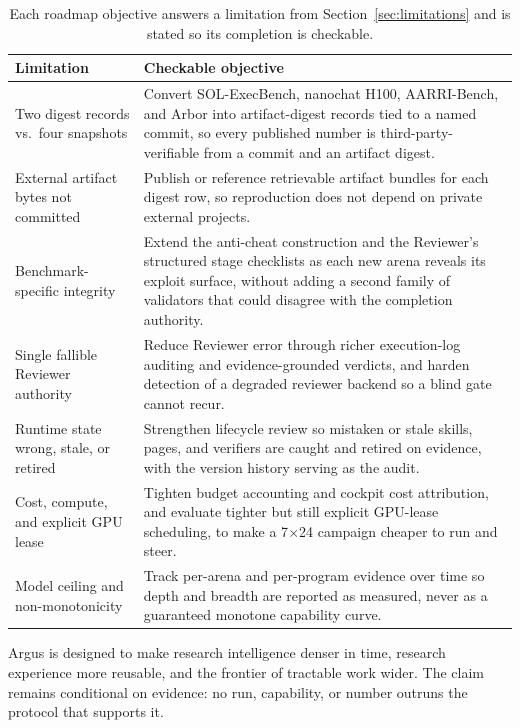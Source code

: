 \begin{table}[H]
\centering
\small
\begin{tabularx}{\linewidth}{@{}p{4.9cm} X@{}}
\toprule
\textbf{Limitation} & \textbf{Checkable objective} \\
\midrule
Two digest records vs.\ four snapshots & Convert SOL-ExecBench, nanochat H100,
AARRI-Bench, and Arbor into artifact-digest records tied to a named commit, so every
published number is third-party-verifiable from a commit and an artifact digest. \\
External artifact bytes not committed & Publish or reference retrievable artifact
bundles for each digest row, so reproduction does not depend on private external
projects. \\
Benchmark-specific integrity & Extend the anti-cheat construction and the Reviewer's
structured stage checklists as each new arena reveals its exploit surface, without
adding a second family of validators that could disagree with the completion
authority. \\
Single fallible Reviewer authority & Reduce Reviewer error through richer
execution-log auditing and evidence-grounded verdicts, and harden detection of a
degraded reviewer backend so a blind gate cannot recur. \\
Runtime state wrong, stale, or retired & Strengthen lifecycle review so mistaken or
stale skills, pages, and verifiers are caught and retired on evidence, with the
version history serving as the audit. \\
Cost, compute, and explicit GPU lease & Tighten budget accounting and cockpit cost
attribution, and evaluate tighter but still explicit GPU-lease scheduling, to make a
7$\times$24 campaign cheaper to run and steer. \\
Model ceiling and non-monotonicity & Track per-arena and per-program evidence over
time so depth and breadth are reported as measured, never as a guaranteed monotone
capability curve. \\
\bottomrule
\end{tabularx}
\caption{Each roadmap objective answers a limitation from
Section~\ref{sec:limitations} and is stated so its completion is checkable.}
\label{tab:roadmap}
\end{table}

\begin{callout}
Argus is designed to make research intelligence denser in time, research
experience more reusable, and the frontier of tractable work wider. The claim
remains conditional on evidence: no run, capability, or number outruns the
protocol that supports it.
\end{callout}
